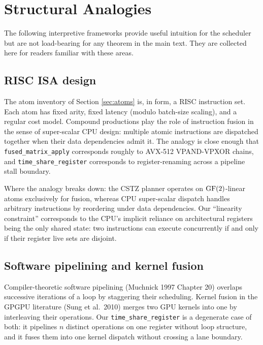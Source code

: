 \section{Structural Analogies}\label{app:analogies}

The following interpretive frameworks provide useful
intuition for the scheduler but are not load-bearing
for any theorem in the main text. They are collected
here for readers familiar with these areas.

\subsection{RISC ISA design}

The atom inventory of Section \ref{sec:atoms} is, in
form, a RISC instruction set. Each atom has fixed
arity, fixed latency (modulo batch-size scaling),
and a regular cost model. Compound productions play
the role of instruction fusion in the sense of
super-scalar CPU design: multiple atomic instructions
are dispatched together when their data dependencies
admit it. The analogy is close enough that
\texttt{fused\_matrix\_apply} corresponds roughly to
AVX-512 VPAND-VPXOR chains, and
\texttt{time\_share\_register} corresponds to
register-renaming across a pipeline stall boundary.

Where the analogy breaks down: the CSTZ planner
operates on $\operatorname{GF}(2)$-linear atoms exclusively for
fusion, whereas CPU super-scalar dispatch handles
arbitrary instructions by reordering under data
dependencies. Our ``linearity constraint'' corresponds
to the CPU's implicit reliance on architectural
registers being the only shared state: two
instructions can execute concurrently if and only if
their register live sets are disjoint.

\subsection{Software pipelining and kernel fusion}

Compiler-theoretic software pipelining (Muchnick 1997
Chapter 20) overlaps successive iterations of a loop
by staggering their scheduling. Kernel fusion in the
GPGPU literature (Sung et al.\ 2010) merges two GPU
kernels into one by interleaving their operations.
Our \texttt{time\_share\_register} is a degenerate
case of both: it pipelines $n$ distinct operations on
one register without loop structure, and it fuses
them into one kernel dispatch without crossing a
lane boundary.

